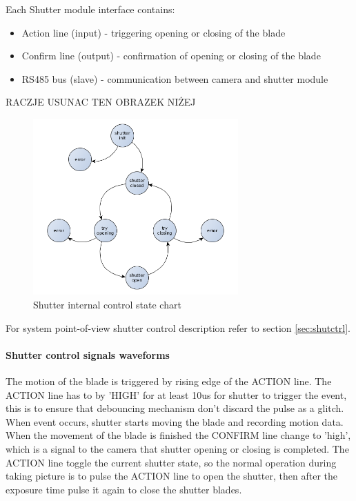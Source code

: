 Each Shutter module interface contains:

\begin{itemize}
\item Action line (input) - triggering opening or closing of the blade
\item Confirm line (output) - confirmation of opening or closing of the blade
\item RS485 bus (slave) - communication between camera and shutter module
\end{itemize}

RACZJE USUNAC TEN OBRAZEK NIŻEJ
\begin{figure}[H]
\centering
\includegraphics[width=0.7\textwidth]{pict_ipc/shutter_control.png}
\caption{Shutter internal control state chart}
\label{fig:shutctrl}
\end{figure}

For system point-of-view shutter control description refer to section \ref{sec:shutctrl}.

\paragraph{Shutter control signals waveforms}

The motion of the blade is triggered by rising edge of the ACTION line. The ACTION line has to by 'HIGH' for at least 10us for shutter to trigger the event, this is to ensure that debouncing mechanism don't discard the pulse as a glitch. 
When event occurs, shutter starts moving the blade and recording motion data. When the movement of the blade is finished the CONFIRM line change to 'high', which is a signal to the camera that shutter opening or closing is 
completed. The ACTION line toggle the current shutter state, so the normal operation during taking picture is to pulse the ACTION line to open the shutter, then after the exposure time pulse it again to close the shutter blades.

